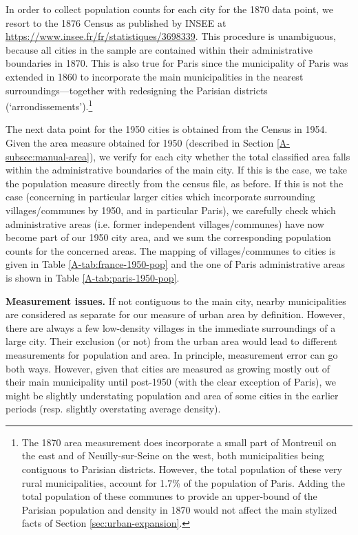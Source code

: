 \documentclass[11pt]{report}
\newcommand{\datatables}{../output/data/tables}
\begin{document}
In order to collect population counts for each city for the 1870 data point, we resort to the 1876 Census as published by INSEE at \url{https://www.insee.fr/fr/statistiques/3698339}. This procedure is unambiguous, because all cities in the sample are contained within their administrative boundaries in 1870. This is also true for Paris since the municipality of Paris was extended in 1860 to incorporate the main municipalities in the nearest surroundings---together with redesigning the Parisian districts (`arrondissements').\footnote{The 1870 area measurement does incorporate a small part of Montreuil on the east and of Neuilly-sur-Seine on the west, both municipalities being contiguous to Parisian districts. However, the total population of these very rural municipalities, account for 1.7\% of the population of Paris. Adding the total population of these communes to provide an upper-bound of the Parisian population and density in 1870 would not affect the main stylized facts of Section \ref{sec:urban-expansion}.}

The next data point for the 1950 cities is obtained from the Census in 1954. Given the area measure obtained for 1950 (described in Section \ref{A-subsec:manual-area}), we verify for each city whether the total classified area falls within the administrative boundaries of the main city. If this is the case, we take the population measure directly from the census file, as before. If this is not the case (concerning in particular larger cities which incorporate surrounding villages/communes by 1950, and in particular Paris), we carefully check which administrative areas (i.e. former independent villages/communes) have now become part of our 1950 city area, and we sum the corresponding population counts for the concerned areas. The mapping of villages/communes to cities is given in Table \ref{A-tab:france-1950-pop} and the one of Paris administrative areas is shown in Table \ref{A-tab:paris-1950-pop}. 




\pagebreak




\textbf{Measurement issues.} If not contiguous to the main city, nearby municipalities are considered as separate for our measure of urban area by definition. However, there are always a few low-density villages in the immediate surroundings of a large city. Their exclusion (or not) from the urban area would lead to different measurements for population and area. In principle, measurement error can go both ways. However, given that cities are measured as growing mostly out of their main municipality until post-1950 (with the clear exception of Paris), we might be slightly understating population and area of some cities in the earlier periods (resp. slightly overstating average density).
\end{document}

